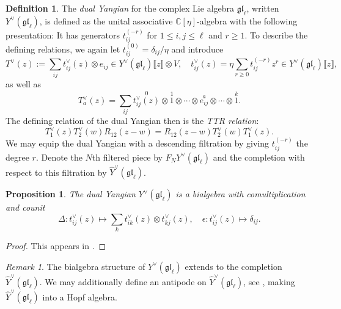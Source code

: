 \documentclass[11pt]{report}
\newtheorem{prop}[theorem]{Proposition}
\theoremstyle{definition}
\newtheorem{definition}[theorem]{Definition}
\theoremstyle{remark}
\newtheorem*{remark}{Remark}
\theoremstyle{remark}
\newcommand{\C}{\mathbb{C}}
\begin{document}
\begin{definition}
The \emph{dual Yangian} for the complex Lie algebra $\mathfrak{gl}_\ell$, written $Y^\vee(\mathfrak{gl}_\ell)$, is defined as the unital associative $\C[\eta]$-algebra with the following presentation: It has generators $t_{ij}^{(-r)}$ for $1 \leq i,j \leq \ell$ and $r \geq 1$. To describe the defining relations, we again let $t_{ij}^{(0)} = \delta_{ij}/\eta$ and introduce
\begin{equation*}
T^\vee(z) := \sum_{ij} t_{ij}^\vee(z) \otimes e_{ij} \in Y^\vee(\mathfrak{gl}_\ell)\llbracket z \rrbracket \otimes V, \quad t_{ij}^\vee(z) = \eta \sum_{r \geq 0} t_{ij}^{(-r)} z^r \in Y^\vee(\mathfrak{gl}_\ell)\llbracket z \rrbracket,
\end{equation*}
as well as
\begin{equation*}
T_a^\vee(z) = \sum_{ij} \overset{0}{t_{ij}^\vee(z)} \otimes \overset{1}{1} \otimes \cdots \otimes \overset{a}{e_{ij}} \otimes \cdots \otimes \overset{k}{1}.
\end{equation*}
The defining relation of the dual Yangian then is the \emph{TTR relation}:
\begin{equation}\label{equation:TTRRelation}
T_1^\vee(z) T_2^\vee(w) R_{12}(z-w) = R_{12}(z-w) T_2^\vee(w) T_1^\vee(z).
\end{equation}
We may equip the dual Yangian with a descending filtration by giving $t_{ij}^{(-r)}$ the degree $r$. Denote the $N$th filtered piece by $F_N Y^\vee(\mathfrak{gl}_\ell)$ and the completion with respect to this filtration by $\hat Y^\vee(\mathfrak{gl}_\ell)$.
\end{definition}

\begin{prop}
The dual Yangian $Y^\vee(\mathfrak{gl}_\ell)$ is a bialgebra with comultiplication and counit
\begin{equation*}
\Delta: t_{ij}^\vee(z) \mapsto \sum_k t_{ik}^\vee(z) \otimes t_{kj}^\vee(z), \quad \epsilon: t_{ij}^\vee(z) \mapsto \delta_{ij}.
\end{equation*}
\end{prop}

\begin{proof}
This appears in \cite{article:nazarov:2019}.
\end{proof}

\begin{remark}
The bialgebra structure of $Y^\vee(\mathfrak{gl}_\ell)$ extends to the completion $\hat Y^\vee(\mathfrak{gl}_\ell)$. We may additionally define an antipode on $\hat Y^\vee(\mathfrak{gl}_\ell)$, see \cite{article:nazarov:2019}, making $\hat Y^\vee(\mathfrak{gl}_\ell)$ into a Hopf algebra.
\end{remark}
\end{document}
